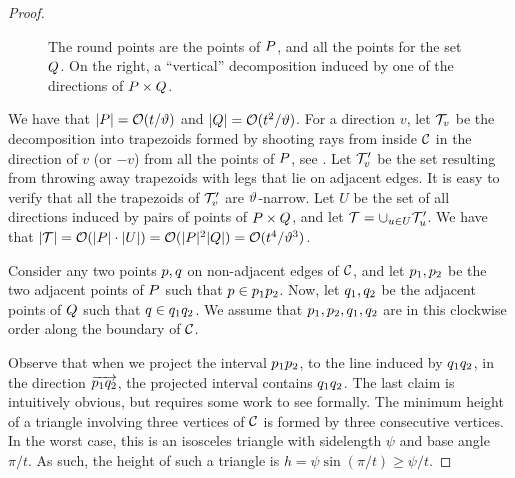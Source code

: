 \documentclass[12pt]{article}%
\begin{document}
\begin{proof}
\begin{figure}[h]
        \phantom{}%
        \caption{The round points are the points of $P$, and all the
           points for the set $Q$. On the right, a ``vertical''
           decomposition induced by one of the directions of
           $P \times Q$.}
    \end{figure}

    We have that $|P| = \mathcal{O}( t /\vartheta)$ and
    $|Q| = \mathcal{O}(t^2/\vartheta)$. For a direction $v$, let $\mathcal{T}_v$ be
    the decomposition into trapezoids formed by shooting rays from
    inside $\mathcal{C}$ in the direction of $v$ (or $-v$) from all the
    points of $P$, see . Let $\mathcal{T}_v'$ be the
    set resulting from throwing away trapezoids with legs that lie on
    adjacent edges.  It is easy to verify that all the trapezoids of
    $\mathcal{T}_v'$ are $\vartheta$-narrow.  Let $U$ be the set of all
    directions induced by pairs of points of $P \times Q$, and
    let $\mathcal{T} = \cup_{u \in U} \mathcal{T}_u'$. We have that
    $|\mathcal{T}| = \mathcal{O}( |P| \cdot |U| ) = \mathcal{O}(|P|^2 |Q| ) =\mathcal{O}(
    t^4 /\vartheta^3)$.

    Consider any two points $p, q$ on non-adjacent edges of
    $\mathcal{C}$, and let $p_1, p_2 $ be the two adjacent points of
    $P$ such that $p \in p_1 p_2$.
    Now, let  $q_1, q_2$ be the adjacent points of $Q$ such
    that $q \in q_1 q_2$.
    We assume that $p_1, p_2, q_1,q_2$ are in this clockwise
    order along the boundary of $\mathcal{C}$.

    Observe that when we project the interval $p_1 p_2$, to the
    line induced by $q_1 q_2$, in the direction
    $\overrightarrow{p_1 q_2}$, the projected interval contains
    $q_1 q_2$.  The last claim is intuitively obvious, but
    requires some work to see formally. The minimum height of a
    triangle involving three vertices of $\mathcal{C}$ is formed by three
    consecutive vertices. In the worst case, this is an isosceles
    triangle with sidelength $\psi$ and base angle $\pi/t$. As such,
    the height of such a triangle is
    $h = \psi \sin( \pi/t) \geq \psi/t$.


\end{proof}
\end{document}
